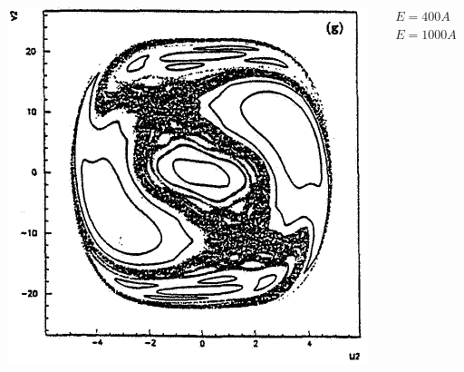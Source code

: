 \documentclass[a4,compress]{beamer}
\begin{document}
\begin{frame}
\begin{columns}[c]
\begin{column}{0.33\textwidth}
    \includegraphics[height=0.45\textheight]{ponicare-sections-e_1000}
  \end{column}
  \begin{column}{0.17\textwidth}
    \small \centering \(E = 400A\) \\
    \vspace{3cm}
    \(E = 1000A\)
  \end{column}
  \end{columns}
\end{frame}

\end{document}
